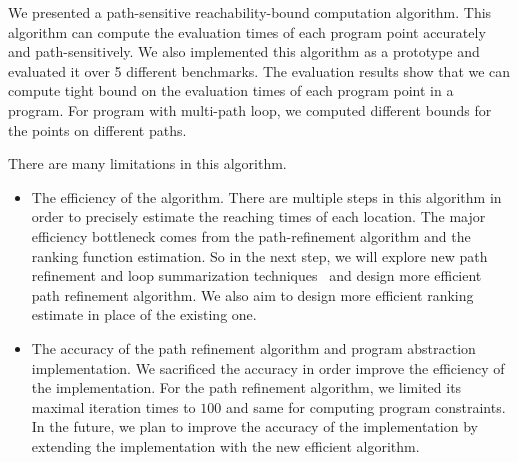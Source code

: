 We presented a path-sensitive reachability-bound computation algorithm.
This algorithm can compute the evaluation times of each program point accurately and path-sensitively.
We also implemented this algorithm as a prototype and evaluated it over 5 different benchmarks.
The evaluation results show that we can compute tight bound on the evaluation times of each program point in a program. For program with multi-path loop, we computed different bounds for the points on different paths.

There are many limitations in this algorithm.
\begin{itemize}
    \item The efficiency of the algorithm.
    There are multiple steps in this algorithm in order to precisely estimate the reaching times of each location.
    The major efficiency bottleneck comes from the path-refinement algorithm and the ranking function estimation. So in the next step, we will explore new path refinement and loop summarization techniques~\cite{} and design more efficient path refinement algorithm. We also aim to design more efficient ranking estimate in place of the existing one.
    \item The accuracy of the path refinement algorithm and program abstraction implementation.
    We sacrificed the accuracy in order improve the efficiency of the implementation. For the path refinement algorithm,
    we limited its maximal iteration times to $100$ and same for computing program constraints. In the future, we plan to improve the accuracy of the implementation by extending the implementation with the new efficient algorithm.
\end{itemize}